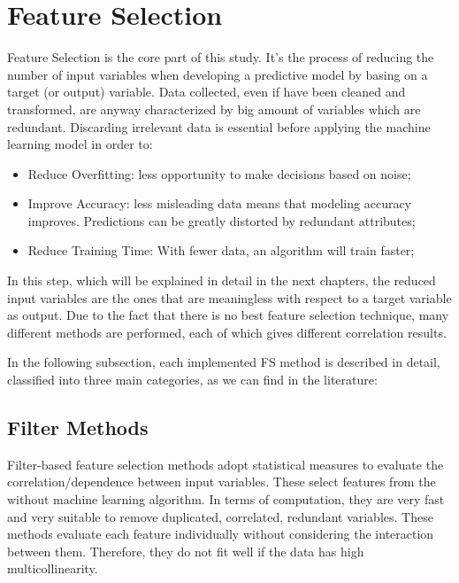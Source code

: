 \section{Feature Selection}
Feature Selection is the core part of this study. It's the process of reducing the number of input variables when developing a predictive model by basing on a target (or output) variable. 
Data collected, even if have been cleaned and transformed, are anyway characterized by big amount of variables which are redundant.
Discarding irrelevant data is essential before applying the machine learning model in order to:
\begin{itemize}
\item Reduce Overfitting: less opportunity to make decisions based on noise;
\item Improve Accuracy: less misleading data means that modeling accuracy improves. Predictions can be greatly distorted by redundant attributes;
\item Reduce Training Time: With fewer data, an algorithm will train faster;
\end{itemize}
In this step, which will be explained in detail in the next chapters, the reduced input variables are the ones that are meaningless with respect to a target variable as output. \newline
Due to the fact that there is no best feature selection technique, many different methods are performed, each of which gives different correlation results.\par
In the following subsection, each implemented FS method is described in detail, classified into three main categories\cite{stanczyk2015feature}, as we can find in the literature:
\subsection{Filter Methods}
Filter-based feature selection methods adopt statistical measures to evaluate the correlation/dependence between input variables.\newline
These select features from the without machine learning algorithm. In terms of computation, they are very fast and very suitable to remove duplicated, correlated, redundant variables\cite{saeys2007review}. \newline
These methods evaluate each feature individually without considering the interaction between them. Therefore, they do not fit well if the data has high multicollinearity\cite{daoud2017multicollinearity}.

